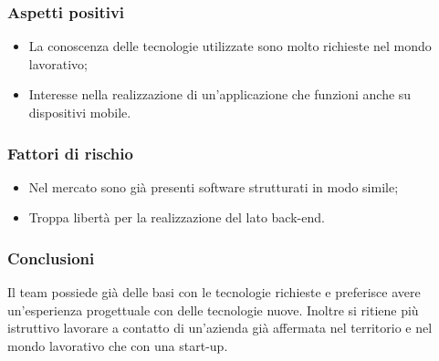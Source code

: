 		\subsubsection{Aspetti positivi}
		\begin{itemize}
			\item La conoscenza delle tecnologie utilizzate sono molto richieste nel mondo lavorativo;
			\item Interesse nella realizzazione di un'applicazione che funzioni anche su dispositivi mobile.
		\end{itemize}
		\subsubsection{Fattori di rischio}
		\begin{itemize}
			\item Nel mercato sono già presenti software strutturati in modo simile;
			\item Troppa libertà per la realizzazione del lato back-end.
		\end{itemize}
		\subsubsection{Conclusioni}
		Il team possiede già delle basi con le tecnologie richieste e preferisce avere un'esperienza progettuale con delle tecnologie nuove. Inoltre si ritiene più istruttivo lavorare a contatto di un'azienda già affermata nel territorio e nel mondo lavorativo che con una start-up.
	
	